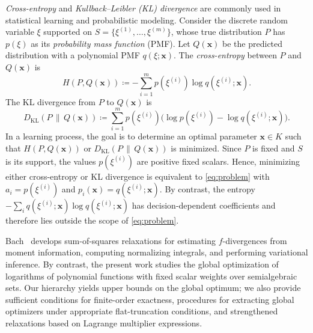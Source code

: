 \documentclass[pdflatex,sn-mathphys-num]{sn-jnl}%
\newcommand{\rd}[1]{{\color{red}#1}}
\newcommand{\vect}[1]{\boldsymbol{#1}}
\theoremstyle{thmstyleone}%
\theoremstyle{thmstyletwo}%
\theoremstyle{thmstylethree}%
\begin{document}
{\it Cross-entropy} and {\it Kullback--Leibler (KL) divergence}
are commonly used in statistical learning and probabilistic modeling.
Consider the discrete random variable $\xi$ supported on 
$S = \{\xi^{(1)}, \ldots, \xi^{(m)}\}$, 
whose true distribution $P$ has $p(\xi)$ as its {\em probability mass function} (PMF).
Let $Q(\vect{x})$ be the predicted distribution with a polynomial PMF $q(\xi; \vect{x})$.
The {\em cross-entropy} between $P$ and $Q(\vect{x})$ is
\[
H(P,Q(\vect{x})) \coloneqq -\sum\limits_{i=1}^m p(\xi^{(i)})\log q(\xi^{(i)}; \vect{x}).
\]
The KL divergence from $P$ to $Q(\vect{x})$ is 
\[
D_{\operatorname{KL}}(P\,\|\,Q(\vect{x})) \coloneqq 
\sum\limits_{i=1}^m p(\xi^{(i)})
\big(\log p(\xi^{(i)})-\log q(\xi^{(i)};\vect{x})\big).
\] 
In a learning process, the goal is to determine an optimal parameter
$\vect{x}\in K$ such that $H(P, Q(\vect{x}))$ or $D_{\operatorname{KL}}(P\,\|\,Q(\vect{x}))$
is minimized.
Since $P$ is fixed and $S$ is its support, the values
$p(\xi^{(i)})$ are positive fixed scalars. Hence, minimizing either
cross-entropy or KL divergence is equivalent to \eqref{eq:problem}
with $a_i=p(\xi^{(i)})$ and
$p_i(\vect{x})=q(\xi^{(i)};\vect{x})$.
By contrast, the entropy
$-\sum_i q(\xi^{(i)};\vect{x})\log q(\xi^{(i)};\vect{x})$ has
decision-dependent coefficients and therefore lies outside the scope of
\eqref{eq:problem}.

\rd{Bach~\cite{Bach2025} develops sum-of-squares relaxations
for estimating $f$-divergences from moment
information, computing normalizing integrals, and performing
variational inference.
By contrast, the present work studies the global optimization of
logarithms of polynomial functions with fixed scalar weights over
semialgebraic sets. Our hierarchy yields upper bounds on the global
optimum; we also provide sufficient conditions for finite-order
exactness, procedures for extracting global optimizers under
appropriate flat-truncation conditions, and strengthened relaxations
based on Lagrange multiplier expressions.}
\end{document}
